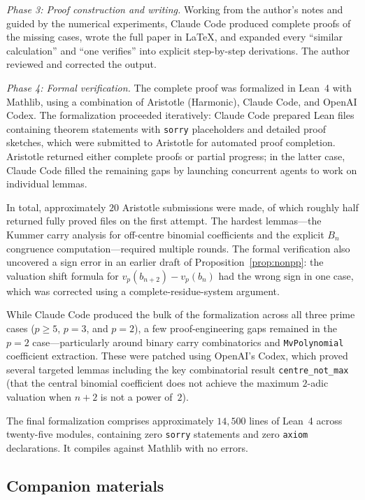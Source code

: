 \documentclass[10pt]{amsart}
\theoremstyle{definition}
\theoremstyle{remark}
\begin{document}
\medskip
\emph{Phase 3: Proof construction and writing.}
Working from the author's notes and guided by the numerical experiments,
Claude Code produced complete proofs of the missing cases, wrote the
full paper in \LaTeX, and expanded every ``similar calculation'' and
``one verifies'' into explicit step-by-step derivations.
The author reviewed and corrected the output.

\medskip
\emph{Phase 4: Formal verification.}
The complete proof was formalized in Lean~4 with Mathlib, using a
combination of Aristotle \cite{Aristotle2025} (Harmonic), Claude Code, and OpenAI Codex.  The formalization
proceeded iteratively: Claude Code prepared Lean files containing
theorem statements with \texttt{sorry} placeholders and detailed
proof sketches, which were submitted to Aristotle for automated proof
completion.  Aristotle returned either complete proofs or partial
progress; in the latter case, Claude Code filled the remaining gaps
by launching concurrent agents to work on individual lemmas.

In total, approximately $20$ Aristotle submissions were made, of which
roughly half returned fully proved files on the first attempt.  The
hardest lemmas---the Kummer carry analysis for off-centre binomial
coefficients and the explicit $B_n$ congruence computation---required
multiple rounds.  The formal verification also uncovered a sign error
in an earlier draft of Proposition~\ref{prop:nonpp}: the valuation
shift formula for $v_p(b_{n+2}) - v_p(b_n)$ had the wrong sign in
one case, which was corrected using a complete-residue-system argument.

While Claude Code produced the bulk of the formalization across all
three prime cases ($p \ge 5$, $p = 3$, and $p = 2$), a few
proof-engineering gaps remained in the $p = 2$ case---particularly
around binary carry combinatorics and \texttt{MvPolynomial} coefficient
extraction.  These were patched using OpenAI's Codex, which proved
several targeted lemmas including the key combinatorial result
\texttt{centre\_not\_max} (that the central binomial coefficient does
not achieve the maximum $2$-adic valuation when $n+2$ is not a power
of~$2$).

The final formalization comprises approximately $14{,}500$ lines of
Lean~4 across twenty-five modules, containing zero \texttt{sorry}
statements and zero \texttt{axiom} declarations.  It compiles against
Mathlib with no errors.

\subsection*{Companion materials}
\end{document}
